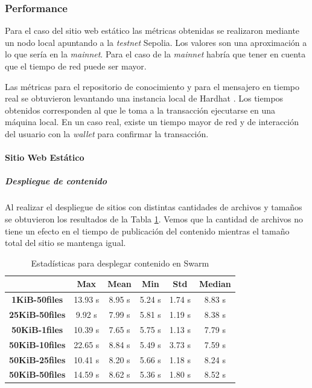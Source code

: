 \subsubsection{Performance\label{performance-blockchain}}

Para el caso del sitio web estático las métricas obtenidas se realizaron mediante un nodo local apuntando a la \textit{testnet} Sepolia. Los valores son una aproximación a lo que sería en la \textit{mainnet}. Para el caso de la \textit{mainnet} habría que tener en cuenta que el tiempo de red puede ser mayor.

Las métricas para el repositorio de conocimiento y para el mensajero en tiempo real se obtuvieron levantando una instancia local de Hardhat \cite{hardhat}. Los tiempos obtenidos corresponden al que le toma a la transacción ejecutarse en una máquina local. En un caso real, existe un tiempo mayor de red y de interacción del usuario con la \textit{wallet} para confirmar la transacción.

\paragraph{Sitio Web Estático}

\subparagraph{Despliegue de contenido}

Al realizar el despliegue de sitios con distintas cantidades de archivos y tamaños se obtuvieron los resultados de la Tabla \ref{table:estadisticas-despliegue-swarm}. Vemos que la cantidad de archivos no tiene un efecto en el tiempo de publicación del contenido mientras el tamaño total del sitio se mantenga igual.

\setlength\tabcolsep{10pt}
\begin{table}[H]
    \centering
    \begin{tabular}{|c|c|c|c|c|c|}
    \hline
    & \textbf{Max} & \textbf{Mean} & \textbf{Min} & \textbf{Std} & \textbf{Median} \\
    \hline
    \textbf{1KiB-50files} & 13.93 s & 8.95 s & 5.24 s & 1.74 s & 8.83 s \\
    \hline
    \textbf{25KiB-50files} & 9.92 s & 7.99 s & 5.81 s & 1.19 s & 8.38 s \\
    \hline
    \textbf{50KiB-1files} & 10.39 s & 7.65 s & 5.75 s & 1.13 s & 7.79 s \\
    \hline
    \textbf{50KiB-10files} & 22.65 s & 8.84 s & 5.49 s & 3.73 s & 7.59 s \\
    \hline
    \textbf{50KiB-25files} & 10.41 s & 8.20 s & 5.66 s & 1.18 s & 8.24 s \\
    \hline
    \textbf{50KiB-50files} & 14.59 s & 8.62 s & 5.36 s & 1.80 s & 8.52 s \\
    \hline
    \end{tabular}
    \caption{Estadísticas para desplegar contenido en Swarm}
    \label{table:estadisticas-despliegue-swarm}
\end{table}

